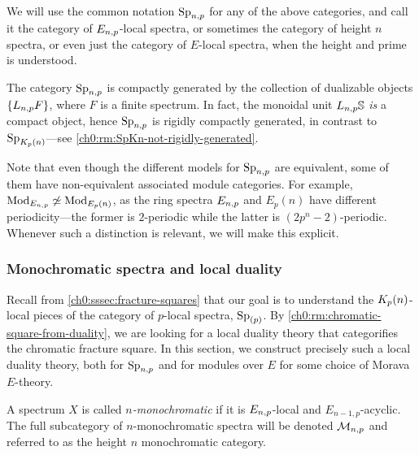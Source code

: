 \begin{notation}
    We will use the common notation $\mathrm{Sp}_{n,p}$ for any of the above categories, and call it the category of $E_{n,p}$-local spectra, or sometimes the category of height $n$ spectra, or even just the category of $E$-local spectra, when the height and prime is understood. 
\end{notation}

\begin{remark}
    The category $\mathrm{Sp}_{n,p}$ is compactly generated by the collection of dualizable objects $\{L_{n,p} F\}$, where $F$ is a finite spectrum. In fact, the monoidal unit $L_{n,p}\mathbb{S}$ \emph{is} a compact object, hence $\mathrm{Sp}_{n,p}$ is rigidly compactly generated, in contrast to $\mathrm{Sp}_{{K_p(n)}}$---see \cref{ch0:rm:SpKn-not-rigidly-generated}.
\end{remark}

\begin{remark}
    Note that even though the different models for $\mathrm{Sp}_{n,p}$ are equivalent, some of them have non-equivalent associated module categories. For example, $\mathrm{Mod}_{E_{n,p}}\not \simeq \mathrm{Mod}_{E_p(n)}$, as the ring spectra $E_{n,p}$ and $E_p(n)$ have different periodicity---the former is $2$-periodic while the latter is $(2p^n-2)$-periodic. Whenever such a distinction is relevant, we will make this explicit. 
\end{remark}





\subsubsection{Monochromatic spectra and local duality}
\label{ch0:sssec:monochromatic-duality}

Recall from \cref{ch0:sssec:fracture-squares} that our goal is to understand the ${K_p(n)}$-local pieces of the category of $p$-local spectra, $\mathrm{Sp}_{(p)}$. By \cref{ch0:rm:chromatic-square-from-duality}, we are looking for a local duality theory that categorifies the chromatic fracture square. In this section, we construct precisely such a local duality theory, both for $\mathrm{Sp}_{n,p}$ and for modules over $E$ for some choice of Morava $E$-theory. 



\begin{definition}
    \label{ch0:def:monochromatic-spectrum}
    A spectrum $X$ is called \emph{$n$-monochromatic} if it is $E_{n,p}$-local and $E_{n-1,p}$-acyclic. The full subcategory of $n$-monochromatic spectra will be denoted $\mathcal{M}_{n,p}$ and referred to as the height $n$ monochromatic category.
\end{definition}

